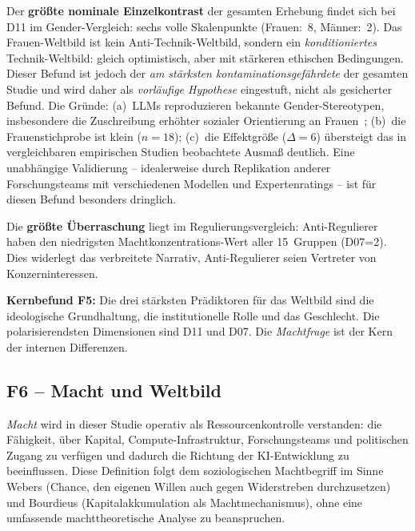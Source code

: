 \documentclass[12pt,a4paper]{article}
\begin{document}
Der \textbf{größte nominale Einzelkontrast} der gesamten Erhebung findet sich bei D11 im Gender-Vergleich: sechs volle Skalenpunkte (Frauen:~8, Männer:~2). Das Frauen-Weltbild ist kein Anti-Technik-Weltbild, sondern ein \emph{konditioniertes} Technik-Weltbild: gleich optimistisch, aber mit stärkeren ethischen Bedingungen. Dieser Befund ist jedoch der \emph{am stärksten kontaminationsgefährdete} der gesamten Studie und wird daher als \emph{vorläufige Hypothese} eingestuft, nicht als gesicherter Befund. Die Gründe: (a)~LLMs reproduzieren bekannte Gender-Stereotypen, insbesondere die Zuschreibung erhöhter sozialer Orientierung an Frauen~\citep{Santurkar2023}; (b)~die Frauenstichprobe ist klein ($n = 18$); (c)~die Effektgröße ($\Delta = 6$) übersteigt das in vergleichbaren empirischen Studien beobachtete Ausmaß deutlich. Eine unabhängige Validierung -- idealerweise durch Replikation anderer Forschungsteams mit verschiedenen Modellen und Expertenratings -- ist für diesen Befund besonders dringlich.

Die \textbf{größte Überraschung} liegt im Regulierungsvergleich: Anti-Regulierer haben den niedrigsten Machtkonzentrations-Wert aller 15~Gruppen (D07=2). Dies widerlegt das verbreitete Narrativ, Anti-Regulierer seien Vertreter von Konzerninteressen.

\medskip
\noindent\textbf{Kernbefund F5:} Die drei stärksten Prädiktoren für das Weltbild sind die ideologische Grundhaltung, die institutionelle Rolle und das Geschlecht. Die polarisierendsten Dimensionen sind D11 und D07. Die \emph{Machtfrage} ist der Kern der internen Differenzen.


\subsection{F6 -- Macht und Weltbild}
\label{sec:ergebnisse:f6}

\emph{Macht} wird in dieser Studie operativ als Ressourcenkontrolle verstanden: die Fähigkeit, über Kapital, Compute-Infrastruktur, Forschungsteams und politischen Zugang zu verfügen und dadurch die Richtung der KI-Entwicklung zu beeinflussen. Diese Definition folgt dem soziologischen Machtbegriff im Sinne Webers (\glqq Chance, den eigenen Willen auch gegen Widerstreben durchzusetzen\grqq) und Bourdieus (Kapitalakkumulation als Machtmechanismus), ohne eine umfassende machttheoretische Analyse zu beanspruchen.
\end{document}
